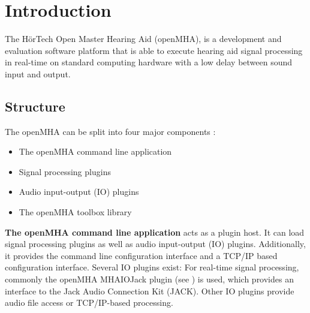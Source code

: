 \section{Introduction}
The H\"{o}rTech Open Master Hearing Aid (openMHA), is a development and evaluation software platform that is able to execute hearing aid signal processing in real-\/time on standard computing hardware with a low delay between sound input and output.

\subsection{Structure}\label{index_str}
The openMHA can be split into four major components :
\begin{itemize}
\item The openMHA command line application
\item Signal processing plugins
\item Audio input-\/output (IO) plugins
\item The openMHA toolbox library
\end{itemize} 

{\bf The openMHA command line application} acts as a plugin host. It can load signal processing plugins as well as audio input-\/output (IO) plugins. Additionally, it provides the command line configuration interface and a TCP/IP based configuration interface. Several IO plugins exist: For real-\/time signal processing, commonly the openMHA MHAIOJack plugin (see \PluginManual) is used, which provides an interface to the Jack Audio Connection Kit (JACK). Other IO plugins provide audio file access or TCP/IP-\/based processing.

